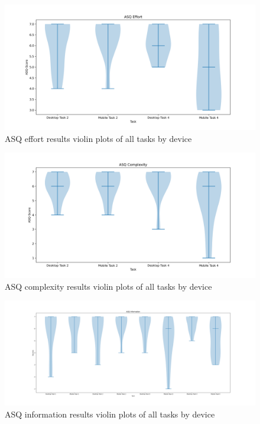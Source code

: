 \begin{figure}[htb]
  \hspace*{-1.4in}
  \centering
  \includegraphics*[width=1.4\textwidth]{Evaluation/img/effort_violin.png}
  \caption{ASQ effort results violin plots of all tasks by device}
  \label{fig:effort_violin}
\end{figure}

\begin{figure}[htb]
  \hspace*{-1.4in}
  \centering
  \includegraphics*[width=1.4\textwidth]{Evaluation/img/complexity_violin.png}
  \caption{ASQ complexity results violin plots of all tasks by device}
  \label{fig:complexity_violin}
\end{figure}

\begin{figure}
  \hspace*{-1.5in}
  \centering
  \includegraphics*[width=1.15\textwidth]{Evaluation/img/information_violin.png}
  \caption{ASQ information results violin plots of all tasks by device}
  \label{fig:info_violin}
\end{figure}

